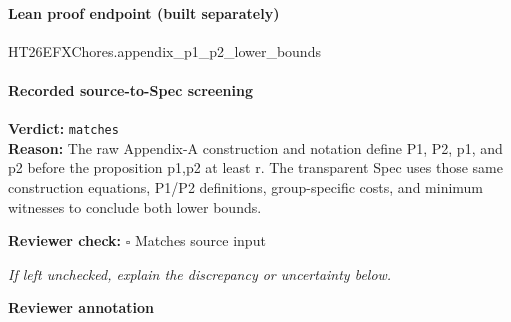 \documentclass[10pt]{article}
\newcommand{\reviewerbox}{%
  \par\noindent\fbox{\parbox{0.96\linewidth}{\rule{0pt}{0.38in}}}\par
}
\newcommand{\reviewmatch}[1]{%
  \par\noindent\textbf{Reviewer check:} $\square$\; #1\par
  \noindent\emph{If left unchecked, explain the discrepancy or uncertainty below.}\par
}
\begin{document}
\paragraph{Lean proof endpoint (built separately)}\begin{ReviewVerbatim}
HT26EFXChores.appendix_p1_p2_lower_bounds
\end{ReviewVerbatim}

\paragraph{Recorded source-to-Spec screening}
\textbf{Verdict:} \texttt{matches}
\\
\textbf{Reason:} The raw Appendix-A construction and notation define P1, P2, p1, and p2 before the proposition p1,p2 at least r. The transparent Spec uses those same construction equations, P1/P2 definitions, group-specific costs, and minimum witnesses to conclude both lower bounds.
\reviewmatch{Matches source input}
\noindent\textbf{Reviewer annotation}\par
\reviewerbox
\end{document}

